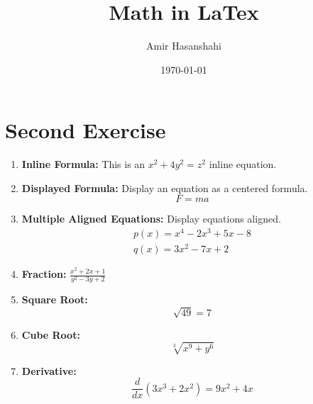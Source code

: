 \documentclass{article}
\title{Math in LaTex}
\author{Amir Hasanshahi}
\date{\today}
\begin{document}
	\maketitle
    
    \section*{Second Exercise}
	\begin{enumerate}
		\item \textbf{Inline Formula:} This is an $x^{2} + 4y^{2} = z^{2}$ inline
			equation.

		\item \textbf{Displayed Formula:} Display an equation as a centered formula.
			\begin{equation}
				F = ma
			\end{equation}

		\item \textbf{Multiple Aligned Equations:} Display equations aligned.
			\begin{align}
				p(x) = x^{4} - 2x^{3} + 5x - 8 \\
				q(x) = 3x^{2} - 7x + 2
			\end{align}

		\item \textbf{Fraction:} $\frac{x^{2} + 2x + 1}{y^{2} - 3y + 2}$

		\item \textbf{Square Root:}
			\begin{equation}
				\sqrt{49}= 7
			\end{equation}

		\item \textbf{Cube Root:}
			\begin{equation}
				\sqrt[3]{x^{9} + y^{6}}
			\end{equation}

		\item \textbf{Derivative:}
			\begin{equation}
				\frac{d}{dx}(3x^{3} + 2x^{2}) = 9x^{2} + 4x
			\end{equation}
	\end{enumerate}
\end{document}
